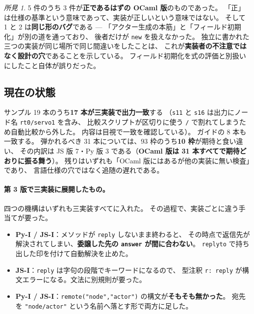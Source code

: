 \documentclass[11pt,a4paper]{ltjsarticle}
\theoremstyle{definition}
\theoremstyle{remark}
\newtheorem{finding}[theorem]{所見}
\begin{document}
\begin{finding}
5 件のうち 3 件が\textbf{正であるはずの OCaml 版}のものであった。
「正」は仕様の基準という意味であって、実装が正しいという意味ではない。
そして 1 と 2 は\textbf{同じ形のバグ}である ---
「アクター生成の本筋」と「フィールド初期化」が別の道を通っており、
後者だけが \texttt{new} を扱えなかった。
独立に書かれた三つの実装が同じ場所で同じ間違いをしたことは、
これが\textbf{実装者の不注意ではなく設計の穴}であることを示している。
フィールド初期化を式の評価と別扱いにしたこと自体が誤りだった。
\end{finding}

\subsection{現在の状態}

サンプル 19 本のうち\textbf{17 本が三実装で出力一致}する
（\texttt{s11} と \texttt{s16} は出力にノード名 \texttt{rt0/servo1} を含み、
比較スクリプトが区切りに使う \texttt{/} で割れてしまうため自動比較から外した。
内容は目視で一致を確認している）。
ガイドの 8 本も一致する。
弾かれるべき 31 本については、93 枠のうち\textbf{10 枠}が期待と食い違い、
その内訳は JS 版 7・Py 版 3 である（\textbf{OCaml 版は 31 本すべてで期待どおりに振る舞う}）。
残りはいずれも「OCaml 版にはあるが他の実装に無い検査」であり、
言語仕様の穴ではなく追随の遅れである。

\paragraph{第 3 版で三実装に展開したもの。}
四つの機構はいずれも三実装すべてに入れた。
その過程で、実装ごとに違う手当てが要った。

\begin{itemize}
\item \textbf{Py-I / JS-I}：メソッドが \texttt{reply} しないまま終わると、
      その時点で返信先が解決されてしまい、\textbf{委譲した先の \texttt{answer} が間に合わない}。
      \texttt{replyto} で持ち出した印を付けて自動解決を止めた。
\item \textbf{JS-I}：\texttt{reply} は字句の段階でキーワードになるので、
      型注釈 \texttt{r: reply} が構文エラーになる。文法に別規則が要った。
\item \textbf{Py-I / JS-I}：\texttt{remote("node","actor")} の構文が\textbf{そもそも無かった}。
      宛先を \texttt{"node/actor"} という名前へ落とす形で両方に足した。
\end{itemize}
\end{document}
